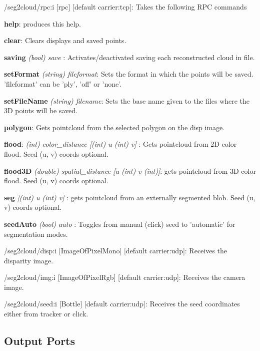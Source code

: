 \begin{DoxyItemize}
\item /seg2cloud/rpc\-:i \mbox{[}rpc\mbox{]} \mbox{[}default carrier\-:tcp\mbox{]}\-: Takes the following R\-P\-C commands
\begin{DoxyEnumerate}
\item {\bfseries help}\-: produces this help.
\item {\bfseries clear}\-: Clears displays and saved points.
\item {\bfseries saving} {\itshape (bool) save }\-: Activates/deactivated saving each reconstructed cloud in file.
\item {\bfseries set\-Format } {\itshape (string) fileformat}\-: Sets the format in which the points will be saved. 'fileformat' can be 'ply', 'off' or 'none'.
\item {\bfseries set\-File\-Name } {\itshape  (string) filename}\-: Sets the base name given to the files where the 3\-D points will be saved.
\item {\bfseries polygon}\-: Gets pointcloud from the selected polygon on the disp image.
\item {\bfseries flood}\-: {\itshape  (int) color\-\_\-distance \mbox{[}(int) u (int) v\mbox{]} }\-: Gets pointcloud from 2\-D color flood. Seed (u, v) coords optional.
\item {\bfseries flood3\-D } {\itshape  (double) spatial\-\_\-distance \mbox{[}u (int) v (int)\mbox{]}}\-: gets pointcloud from 3\-D color flood. Seed (u, v) coords optional.
\item {\bfseries seg} {\itshape  \mbox{[}(int) u (int) v\mbox{]} }\-: gets pointcloud from an externally segmented blob. Seed (u, v) coords optional.
\item {\bfseries seed\-Auto} {\itshape (bool) auto }\-: Toggles from manual (click) seed to 'automatic' for segmentation modes.
\end{DoxyEnumerate}
\item /seg2cloud/disp\-:i \mbox{[}Image\-Of\-Pixel\-Mono\mbox{]} \mbox{[}default carrier\-:udp\mbox{]}\-: Receives the disparity image.
\item /seg2cloud/img\-:i \mbox{[}Image\-Of\-Pixel\-Rgb\mbox{]} \mbox{[}default carrier\-:udp\mbox{]}\-: Receives the camera image.
\item /seg2cloud/seed\-:i \mbox{[}Bottle\mbox{]} \mbox{[}default carrier\-:udp\mbox{]}\-: Receives the seed coordinates either from tracker or click.
\end{DoxyItemize}\hypertarget{group__seg2cloud_outputports_sec}{}\subsection{Output Ports}\label{group__seg2cloud_outputports_sec}


